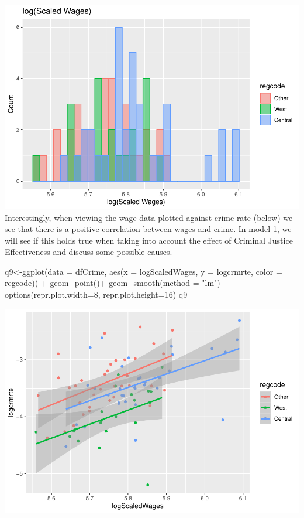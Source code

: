 \documentclass[]{article}
\newenvironment{Shaded}{}{}
\newcommand{\DataTypeTok}[1]{#1}
\newcommand{\DecValTok}[1]{#1}
\newcommand{\KeywordTok}[1]{\textcolor[rgb]{0.00,0.00,1.00}{#1}}
\newcommand{\NormalTok}[1]{#1}
\newcommand{\OperatorTok}[1]{#1}
\newcommand{\StringTok}[1]{\textcolor[rgb]{0.00,0.50,0.50}{#1}}
\begin{document}
\includegraphics{Bagnard_Gaustad_Hartman_Leung_Lab_3_files/figure-latex/unnamed-chunk-55-1.pdf}
Interestingly, when viewing the wage data plotted against crime rate
(below) we see that there is a positive correlation between wages and
crime. In model 1, we will see if this holds true when taking into
account the effect of Criminal Justice Effectiveness and discuss some
possible causes.

\begin{Shaded}
\begin{Highlighting}[]
\NormalTok{q9<-}\KeywordTok{ggplot}\NormalTok{(}\DataTypeTok{data =}\NormalTok{ dfCrime, }\KeywordTok{aes}\NormalTok{(}\DataTypeTok{x =}\NormalTok{ logScaledWages, }\DataTypeTok{y =}\NormalTok{ logcrmrte, }\DataTypeTok{color =}\NormalTok{ regcode)) }\OperatorTok{+}
\StringTok{      }\KeywordTok{geom_point}\NormalTok{()}\OperatorTok{+}
\StringTok{  }\KeywordTok{geom_smooth}\NormalTok{(}\DataTypeTok{method =} \StringTok{"lm"}\NormalTok{)}
\KeywordTok{options}\NormalTok{(}\DataTypeTok{repr.plot.width=}\DecValTok{8}\NormalTok{, }\DataTypeTok{repr.plot.height=}\DecValTok{16}\NormalTok{)}
\NormalTok{q9}
\end{Highlighting}
\end{Shaded}

\includegraphics{Bagnard_Gaustad_Hartman_Leung_Lab_3_files/figure-latex/unnamed-chunk-56-1.pdf}
\end{document}
